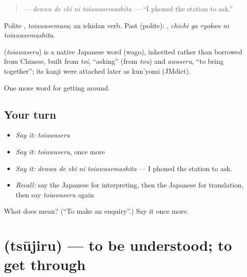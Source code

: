 \begin{quote}
\textbf{  } — \emph{denwa de eki ni toiawasemashita} — \textquotedblleft{}I phoned the station to ask.\textquotedblright{}
\end{quote}

Polite \textbf{}, \emph{toiawasemasu}; an ichidan verb. Past (polite): \textbf{  }, \emph{chichi ga ryokan ni toiawasemashita}.

\begin{cousinweb}
\textbf{} (\emph{toiawaseru}) is a native Japanese word (wago), inherited rather than borrowed from Chinese, built from \emph{toi}, \textquotedblleft{}asking\textquotedblright{} (from \emph{tou}) and \emph{awaseru}, \textquotedblleft{}to bring together\textquotedblright{}; its kanji were attached later as kun'yomi (JMdict).
\end{cousinweb}

\begin{grammarlens}[title={What you've built}]
One more word for getting around.
\end{grammarlens}

\subsection*{Your turn}
\begin{itemize}
\raggedright
  \item \emph{Say it:} \emph{toiawaseru}
  \item \emph{Say it:} \emph{toiawaseru}, once more
  \item \emph{Say it:} \emph{denwa de eki ni toiawasemashita} — I phoned the station to ask.
  \item \emph{Recall:} say the Japanese for interpreting, then the Japanese for translation, then say \emph{toiawaseru} again
\end{itemize}

\begin{tcolorbox}[breakable,colback=teal!4,colframe=teal!35!black,title={Before you move on}]
What does  mean? (\textquotedblleft{}To make an enquiry\textquotedblright{}.) Say it once more.
\end{tcolorbox}
\section[\texorpdfstring{\ja{つうじる} (tsūjiru)}{つうじる (tsūjiru)}]{ (tsūjiru) — to be understood; to get through}

